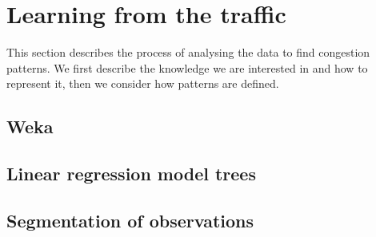 \section{Learning from the traffic}
This section describes the process of analysing the data to find congestion patterns. We first describe the knowledge we are interested in and how to represent it, then we consider how patterns are defined.

\subsection{Weka}
\subsection{Linear regression model trees}
\subsection{Segmentation of observations}
